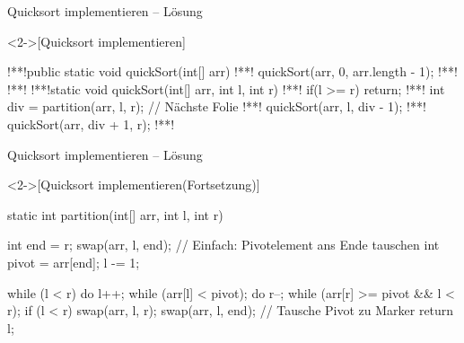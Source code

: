 \begin{frame}[fragile,c]{Quicksort implementieren -- Lösung}
    \begin{solve}<2->[Quicksort implementieren]
\begin{plainjava}
!**!public static void quickSort(int[] arr) {
!**!    quickSort(arr, 0, arr.length - 1);
!**!}
!**!
!**!static void quickSort(int[] arr, int l, int r) {
!**!    if(l >= r) return;
!**!    int div = partition(arr, l, r); // Nächste Folie
!**!    quickSort(arr, l, div - 1);
!**!    quickSort(arr, div + 1, r);
!**!}
    \end{plainjava}
    \end{solve}
\end{frame}

\begin{frame}[fragile,c]{Quicksort implementieren -- Lösung}
    \addtocounter{solve}{-1}%
    \begin{solve}<2->[Quicksort implementieren\hfill(Fortsetzung)]
\begin{plainjava}
static int partition(int[] arr, int l, int r) {
    int end = r;
    swap(arr, l, end); // Einfach: Pivotelement ans Ende tauschen
    int pivot = arr[end];
    l -= 1;

    while (l < r) {
        do { l++; } while (arr[l] < pivot);
        do { r--; } while (arr[r] >= pivot && l < r);
        if (l < r) swap(arr, l, r);
    }
    swap(arr, l, end); // Tausche Pivot zu Marker
    return l;
}
    \end{plainjava}
    \end{solve}
\end{frame}

\fi

